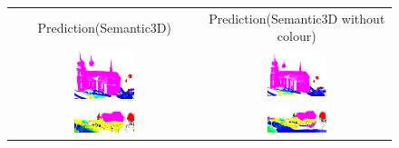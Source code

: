     \begin{figure}[h!]
        \centering
        \begin{tabular}{cc}
            Prediction(Semantic3D) & Prediction(Semantic3D without colour)\\
            \includegraphics[width=0.33\textwidth, height=0.18\textheight]{images/ood_imgs/de_sem3d/de_class_prob_1.pdf}&
            \includegraphics[width=0.33\textwidth, height=0.18\textheight]{images/sem3d_of/de_sem3d_of_1.pdf}\\

            \includegraphics[width=0.33\textwidth, height=0.18\textheight]{images/ood_imgs/de_sem3d/de_class_prob_2.pdf}&
            \includegraphics[width=0.33\textwidth, height=0.18\textheight]{images/sem3d_of/de_sem3d_of_2.pdf}\\


\end{tabular}
\end{figure}
